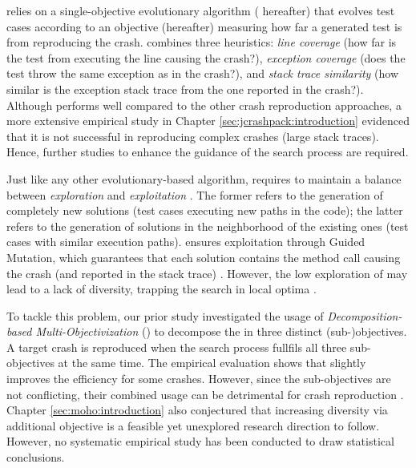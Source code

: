\evocrash relies on a single-objective evolutionary algorithm (\textit{\SGGA} hereafter) that evolves test cases according to an objective (\CrashFunction hereafter) measuring how far a generated test is from reproducing the crash. \CrashFunction combines three heuristics: \textit{line coverage} (how far is the test from executing the line causing the crash?), \textit{exception coverage} (does the test throw the same exception as in the crash?), and \textit{stack trace similarity} (how similar is the exception stack trace from the one reported in the crash?). %
%
Although \SGGA performs well compared to the other crash reproduction approaches, a more extensive empirical study in Chapter \ref{sec:jcrashpack:introduction} evidenced that it is not successful in reproducing complex crashes (\ie large stack traces). Hence, further studies to enhance the guidance of the search process are required.

Just like any other evolutionary-based algorithm, \SGGA requires to maintain a balance between \textit{exploration} and \textit{exploitation} \cite{vcrepinvsek2013}. The former refers to the generation of completely new solutions (\ie test cases executing new paths in the code); the latter refers to the generation of solutions in the neighborhood of the existing ones (\ie test cases with similar execution paths). \SGGA ensures exploitation through Guided Mutation, which guarantees that each solution contains the method call causing the crash (and reported in the stack trace) \cite{Soltani2018a}. However, the low exploration of \SGGA may lead to a lack of diversity, trapping the search in local optima \cite{vcrepinvsek2013}.

To tackle this problem, our prior study \cite{Soltani2018b} investigated the usage of \textit{De\-com\-po\-si\-tion-based Multi-Objectivization} (\decomposition) to decompose the \CrashFunction in three distinct (sub-)objectives. A target crash is reproduced when the search process fullfils all three sub-objectives at the same time. The empirical evaluation shows that \decomposition slightly improves the efficiency for some crashes. However, since the sub-objectives are not conflicting, their combined usage can be detrimental for crash reproduction \cite{Soltani2018b}. Chapter \ref{sec:moho:introduction} also conjectured that increasing diversity via additional objective is a feasible yet unexplored  research direction to follow. However, no systematic empirical study has been conducted to draw statistical conclusions.


